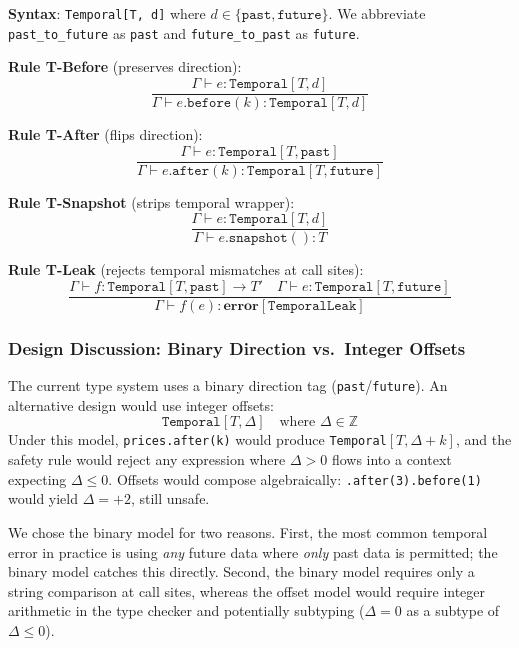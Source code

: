 \documentclass[11pt,a4paper]{article}
\newcommand{\ty}[1]{\texttt{#1}}
\begin{document}
\textbf{Syntax}: \ty{Temporal[T, d]} where $d \in \{\ty{past}, \ty{future}\}$. We abbreviate \ty{past\_to\_future} as \ty{past} and \ty{future\_to\_past} as \ty{future}.

\textbf{Rule T-Before} (preserves direction):
\begin{equation}
\frac{\Gamma \vdash e : \ty{Temporal}[T, d]}{\Gamma \vdash e.\ty{before}(k) : \ty{Temporal}[T, d]}
\end{equation}

\textbf{Rule T-After} (flips direction):
\begin{equation}
\frac{\Gamma \vdash e : \ty{Temporal}[T, \ty{past}]}{\Gamma \vdash e.\ty{after}(k) : \ty{Temporal}[T, \ty{future}]}
\end{equation}

\textbf{Rule T-Snapshot} (strips temporal wrapper):
\begin{equation}
\frac{\Gamma \vdash e : \ty{Temporal}[T, d]}{\Gamma \vdash e.\ty{snapshot}() : T}
\end{equation}

\textbf{Rule T-Leak} (rejects temporal mismatches at call sites):
\begin{equation}
\frac{\Gamma \vdash f : \ty{Temporal}[T, \ty{past}] \to T' \quad \Gamma \vdash e : \ty{Temporal}[T, \ty{future}]}{\Gamma \vdash f(e) : \textbf{error}[\ty{TemporalLeak}]}
\end{equation}

\subsubsection{Design Discussion: Binary Direction vs.\ Integer Offsets}

The current type system uses a binary direction tag (\ty{past}/\ty{future}). An alternative design would use integer offsets:
\[
\ty{Temporal}[T, \Delta] \quad \text{where } \Delta \in \mathbb{Z}
\]
Under this model, \ty{prices.after(k)} would produce \ty{Temporal}$[T, \Delta+k]$, and the safety rule would reject any expression where $\Delta > 0$ flows into a context expecting $\Delta \leq 0$. Offsets would compose algebraically: \ty{.after(3).before(1)} would yield $\Delta = +2$, still unsafe.

We chose the binary model for two reasons. First, the most common temporal error in practice is using \emph{any} future data where \emph{only} past data is permitted; the binary model catches this directly. Second, the binary model requires only a string comparison at call sites, whereas the offset model would require integer arithmetic in the type checker and potentially subtyping ($\Delta = 0$ as a subtype of $\Delta \leq 0$).
\end{document}
